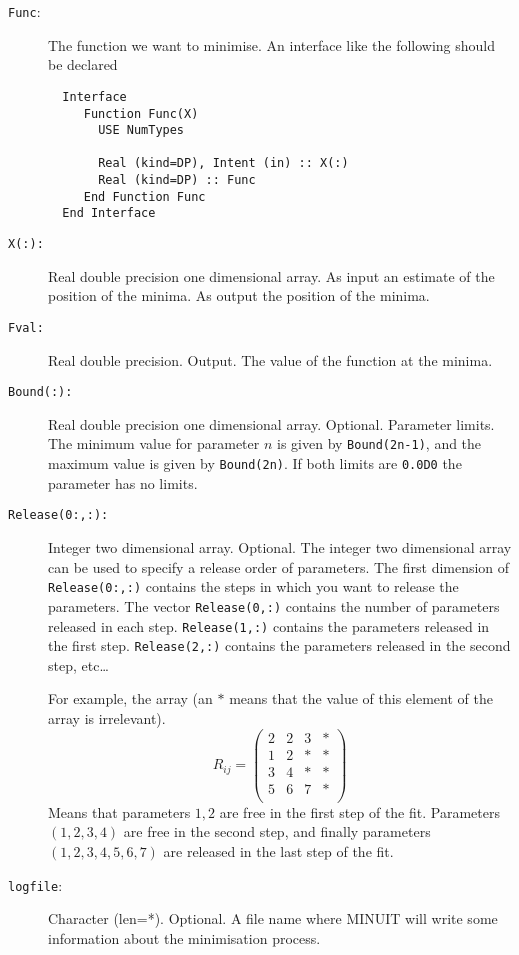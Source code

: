 \begin{description}
\item[\texttt{Func}:]  The function we want to minimise. An interface
  like the following should be declared
\begin{verbatim}
  Interface
     Function Func(X)
       USE NumTypes
       
       Real (kind=DP), Intent (in) :: X(:)
       Real (kind=DP) :: Func
     End Function Func
  End Interface
\end{verbatim}
\item[\texttt{X(:): }] Real double precision one dimensional array. As
  input an estimate of 
  the position of the minima. As output the position of the minima.
\item[\texttt{Fval:}] Real double precision. Output. The value of the
  function at the minima.
\item[\texttt{Bound(:): }] Real double precision one dimensional
  array. Optional. Parameter limits. The minimum value for parameter
  $n$ is given by \texttt{Bound(2n-1)}, and the maximum value is given
  by \texttt{Bound(2n)}. If both limits are \texttt{0.0D0} the
  parameter has no limits.
\item[\texttt{Release(0:,:):}] Integer two dimensional
  array. Optional. The integer two dimensional array can be used to
  specify a release order of parameters. The first dimension of
  \texttt{Release(0:,:)} contains the steps in which you want to
  release the parameters. The vector \texttt{Release(0,:)} contains
  the number of parameters released in each
  step. \texttt{Release(1,:)} contains the parameters released in the
  first step. \texttt{Release(2,:)} contains the parameters released in the
  second step, etc\dots

  For example, the array (an $*$ means that the value of this element
  of the array is irrelevant).
  \begin{equation}
    R_{ij} = \left(
      \begin{array}{cccc}
        2 & 2 & 3 & * \\
        1 & 2 & * & * \\
        3 & 4 & * & * \\
        5 & 6 & 7 & * \\
      \end{array}
      \right)
  \end{equation}
  Means that parameters $1,2$ are free in the first step of the
  fit. Parameters $(1,2,3,4)$ are free in the second step, and finally
  parameters $(1,2,3,4,5,6,7)$ are released in the last step of the
  fit.
\item[\texttt{logfile}: ] Character (len=*). Optional. A file name
  where MINUIT will write some information about the minimisation
  process. 
\end{description}

